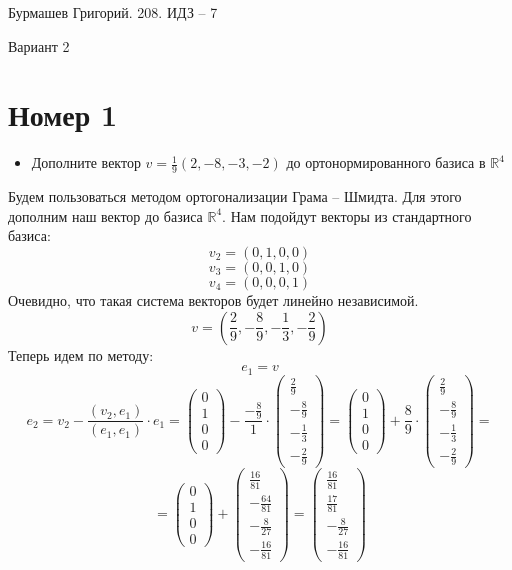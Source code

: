 \documentclass[a4paper,12pt]{article}
\author{Бурмашев Григорий, БПМИ-208}
\title{}
\date{\today}
\begin{document}
 
\begin{center}
Бурмашев Григорий. 208. ИДЗ -- 7

Вариант 2
\end{center}
\section*{Номер 1}
\begin{itemize}
\item 
\begin{center}
Дополните вектор $
v = \frac{1}{9}(2, -8, -3, -2)
$ до ортонормированного базиса в $\mathbb{R}^4$
\end{center}
\end{itemize}

Будем пользоваться методом ортогонализации Грама -- Шмидта. Для этого дополним наш вектор до базиса $\mathbb{R}^4$. Нам подойдут векторы из стандартного базиса:
\[
v_2 = (0, 1, 0, 0)
\]
\[
v_3 = (0, 0, 1, 0)
\]
\[
v_4 = (0, 0, 0, 1)
\]
Очевидно, что такая система векторов будет линейно независимой. 
\[
v = \left(\frac{2}{9}, -\frac{8}{9}, -\frac{1}{3}, -\frac{2}{9} \right)
\]
Теперь идем по методу:
\[
e_1 = v
\]
\[
e_2 = v_2 - \frac{(v_2, e_1)}{(e_1, e_1)} \cdot e_1 = \begin{pmatrix}
0 \\ 1 \\ 0 \\ 0 
\end{pmatrix}
 - \frac{-\frac{8}{9}}{1} \cdot \begin{pmatrix}
\frac{2}{9} \\ -\frac{8}{9} \\-\frac{1}{3} \\ -\frac{2}{9} 
\end{pmatrix} =
\begin{pmatrix}
0 \\ 1 \\ 0 \\ 0 
\end{pmatrix}
 + \frac{8}{9} \cdot \begin{pmatrix}
\frac{2}{9} \\ -\frac{8}{9} \\-\frac{1}{3} \\ -\frac{2}{9} 
\end{pmatrix} =
\]
\[
=
\begin{pmatrix}
0 \\ 1 \\ 0 \\ 0 
\end{pmatrix} + 
\begin{pmatrix}
\frac{16}{81} \\ -\frac{64}{81} \\-\frac{8}{27} \\ -\frac{16}{81} 
\end{pmatrix} = \begin{pmatrix}
\frac{16}{81} \\ \frac{17}{81} \\-\frac{8}{27} \\ -\frac{16}{81} 
\end{pmatrix}
\]
\end{document}

